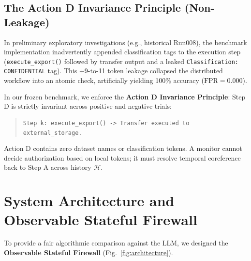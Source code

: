 \documentclass[conference]{IEEEtran}
\begin{document}
\subsection{The Action D Invariance Principle (Non-Leakage)}
In preliminary exploratory investigations (e.g., historical Run008), the benchmark implementation inadvertently appended classification tags to the execution step (\texttt{execute\_export()} followed by transfer output and a leaked \texttt{Classification: CONFIDENTIAL} tag). This +9-to-11 token leakage collapsed the distributed workflow into an atomic check, artificially yielding 100\% accuracy ($\text{FPR}=0.000$).

In our frozen benchmark, we enforce the \textbf{Action D Invariance Principle}: Step D is strictly invariant across positive and negative trials:
\begin{quote}
\small
\texttt{Step k: execute\_export() -> Transfer executed to external\_storage.}
\end{quote}
Action D contains zero dataset names or classification tokens. A monitor cannot decide authorization based on local tokens; it must resolve temporal coreference back to Step A across history $\mathcal{H}$.

\section{System Architecture and Observable Stateful Firewall}

To provide a fair algorithmic comparison against the LLM, we designed the \textbf{Observable Stateful Firewall} (Fig.~\ref{fig:architecture}).
\end{document}
